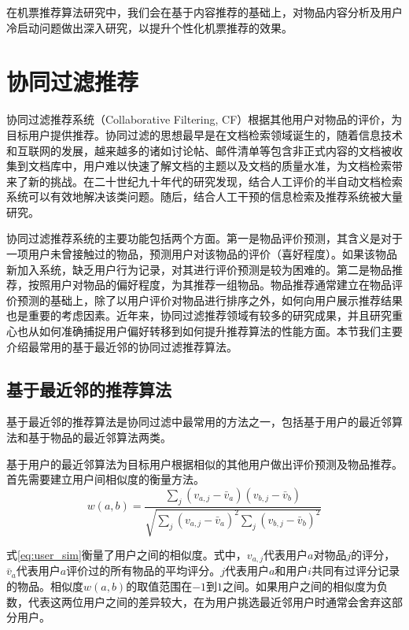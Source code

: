 在机票推荐算法研究中，我们会在基于内容推荐的基础上，对物品内容分析及用户冷启动问题做出深入研究，以提升个性化机票推荐的效果。


\section{协同过滤推荐}

协同过滤推荐系统（Collaborative Filtering, CF）根据其他用户对物品的评价，为目标用户提供推荐。协同过滤的思想最早是在文档检索领域诞生的\cite{schafer2007collaborative}，随着信息技术和互联网的发展，越来越多的诸如讨论帖、邮件清单等包含非正式内容的文档被收集到文档库中，用户难以快速了解文档的主题以及文档的质量水准，为文档检索带来了新的挑战。在二十世纪九十年代的研究发现，结合人工评价的半自动文档检索系统可以有效地解决该类问题。随后，结合人工干预的信息检索及推荐系统被大量研究\cite{goldberg1992using}。

协同过滤推荐系统的主要功能包括两个方面。第一是物品评价预测，其含义是对于一项用户未曾接触过的物品，预测用户对该物品的评价（喜好程度）。如果该物品新加入系统，缺乏用户行为记录，对其进行评价预测是较为困难的。第二是物品推荐，按照用户对物品的偏好程度，为其推荐一组物品。物品推荐通常建立在物品评价预测的基础上，除了以用户评价对物品进行排序之外，如何向用户展示推荐结果也是重要的考虑因素。近年来，协同过滤推荐领域有较多的研究成果，并且研究重心也从如何准确捕捉用户偏好转移到如何提升推荐算法的性能方面。本节我们主要介绍最常用的基于最近邻的协同过滤推荐算法。


\subsection{基于最近邻的推荐算法}
基于最近邻的推荐算法是协同过滤中最常用的方法之一，包括基于用户的最近邻算法和基于物品的最近邻算法两类。

基于用户的最近邻算法为目标用户根据相似的其他用户做出评价预测及物品推荐。首先需要建立用户间相似度的衡量方法\cite{breese1998empirical}。
\begin{equation}
\label{eq:user_sim}
	w(a,b) = \frac{\sum_j(v_{a,j}-\bar{v}_a)(v_{b,j}-\bar{v}_b)}{\sqrt{\sum_j(v_{a,j}-\bar{v}_a)^2\sum_j(v_{b,j}-\bar{v}_b)^2}}
\end{equation}

式\ref{eq:user_sim}衡量了用户之间的相似度。式中，$v_{a,j}$代表用户$a$对物品$j$的评分，$\bar{v}_a$代表用户$a$评价过的所有物品的平均评分。$j$代表用户$a$和用户$i$共同有过评分记录的物品。相似度$w(a,b)$的取值范围在$-1$到$1$之间。如果用户之间的相似度为负数，代表这两位用户之间的差异较大，在为用户挑选最近邻用户时通常会舍弃这部分用户。

